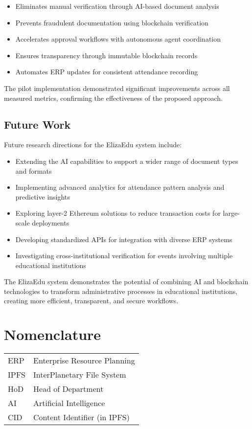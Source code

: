 \documentclass[a4paper,12pt]{article}
\begin{document}
\begin{itemize}
    \item Eliminates manual verification through AI-based document analysis
    \item Prevents fraudulent documentation using blockchain verification
    \item Accelerates approval workflows with autonomous agent coordination
    \item Ensures transparency through immutable blockchain records
    \item Automates ERP updates for consistent attendance recording
\end{itemize}

The pilot implementation demonstrated significant improvements across all measured metrics, confirming the effectiveness of the proposed approach.

\subsection{Future Work}
Future research directions for the ElizaEdu system include:

\begin{itemize}
    \item Extending the AI capabilities to support a wider range of document types and formats
    \item Implementing advanced analytics for attendance pattern analysis and predictive insights
    \item Exploring layer-2 Ethereum solutions to reduce transaction costs for large-scale deployments
    \item Developing standardized APIs for integration with diverse ERP systems
    \item Investigating cross-institutional verification for events involving multiple educational institutions
\end{itemize}

The ElizaEdu system demonstrates the potential of combining AI and blockchain technologies to transform administrative processes in educational institutions, creating more efficient, transparent, and secure workflows.

\section*{Nomenclature}
\begin{tabular}{ll}
ERP & Enterprise Resource Planning \\
IPFS & InterPlanetary File System \\
HoD & Head of Department \\
AI & Artificial Intelligence \\
CID & Content Identifier (in IPFS) \\
\end{tabular}
\end{document}
